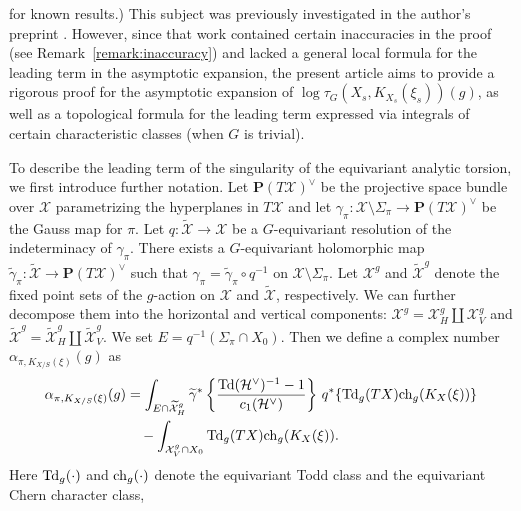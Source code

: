 \documentclass[amscd, leqno]{amsart}
\theoremstyle{plain}
\theoremstyle{definition}
\theoremstyle{remark}
\begin{document}
\cite{Wolpert87, BismutBost90, Bismut97, Yoshikawa04, FLY08, EFM21, ErikssonFreixas26} for known results.) 
This subject was previously investigated in the author's preprint \cite{Yoshikawa10a}. However, since that work contained certain inaccuracies 
in the proof (see Remark~\ref{remark:inaccuracy}) and lacked a general local formula for the leading term in the asymptotic expansion,
the present article aims to provide a rigorous proof for the asymptotic expansion of $\log\tau_{G}(X_{s},K_{X_{s}}(\xi_{s}))(g)$, 
as well as a topological formula for the leading term expressed via integrals of certain characteristic classes (when $G$ is trivial).
\par
To describe the leading term of the singularity of the equivariant analytic torsion, we first introduce further notation.
Let ${\mathbf P}(T{\mathcal X})^{\lor}$ be the projective space bundle over ${\mathcal X}$ parametrizing the hyperplanes in $T{\mathcal X}$
and let $\gamma_{\pi} \colon {\mathcal X} \setminus \Sigma_{\pi} \to {\mathbf P}(T{\mathcal X})^{\lor}$ be the Gauss map for $\pi$. 
Let $q \colon \widetilde{\mathcal X} \to {\mathcal X}$ be a $G$-equivariant resolution of the indeterminacy of $\gamma_{\pi}$. 
There exists a $G$-equivariant holomorphic map
$\widetilde{\gamma}_{\pi} \colon \widetilde{\mathcal X} \to {\mathbf P}(T{\mathcal X})^{\lor}$ such that 
$\gamma_{\pi} = \widetilde{\gamma}_{\pi} \circ q^{-1}$ on ${\mathcal X} \setminus \Sigma_{\pi}$. 
Let ${\mathcal X}^{g}$ and $\widetilde{\mathcal X}^{g}$ denote the fixed point sets of the $g$-action on ${\mathcal X}$ and 
$\widetilde{\mathcal X}$, respectively. We can further decompose them into the horizontal and vertical components:
${\mathcal X}^{g} = {\mathcal X}^{g}_{H} \amalg {\mathcal X}^{g}_{V}$ and
$\widetilde{\mathcal X}^{g} = \widetilde{\mathcal X}^{g}_{H} \amalg \widetilde{\mathcal X}^{g}_{V}$.
We set $E = q^{-1}(\Sigma_{\pi} \cap X_{0})$. Then we define a complex number $\alpha_{\pi, K_{X/S}(\xi)}(g)$ as
$$
\begin{aligned}
\alpha_{\pi,K_{X/S}(\xi)}(g)
&=
\int_{E\cap\widetilde{\mathcal X}^{g}_{H}}
\widetilde{\gamma}^{*}
\left\{
\frac{{\rm Td}({\mathcal H}^{\lor})^{-1}-1}{c_{1}({\mathcal H}^{\lor})}
\right\}\,
q^{*}\{{\rm Td}_{g}(TX){\rm ch}_{g}(K_{X}(\xi))\}
\\
&\quad
-\int_{{\mathcal X}^{g}_{V}\cap X_{0}}{\rm Td}_{g}(TX){\rm ch}_{g}(K_{X}(\xi)).
\end{aligned}
$$
Here ${\rm Td}_{g}(\cdot)$ and ${\rm ch}_{g}(\cdot)$ denote the equivariant Todd class and the equivariant Chern character class,
\end{document}
